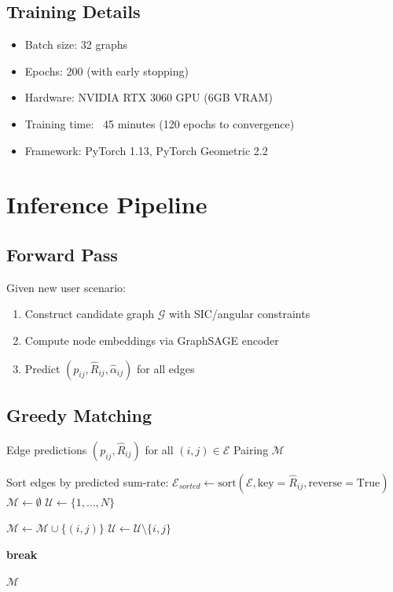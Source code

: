 \subsection{Training Details}

\begin{itemize}
    \item Batch size: 32 graphs
    \item Epochs: 200 (with early stopping)
    \item Hardware: NVIDIA RTX 3060 GPU (6GB VRAM)
    \item Training time: ~45 minutes (120 epochs to convergence)
    \item Framework: PyTorch 1.13, PyTorch Geometric 2.2
\end{itemize}

\section{Inference Pipeline}

\subsection{Forward Pass}

Given new user scenario:
\begin{enumerate}
    \item Construct candidate graph $\mathcal{G}$ with SIC/angular constraints
    \item Compute node embeddings via GraphSAGE encoder
    \item Predict $(p_{ij}, \hat{R}_{ij}, \hat{\alpha}_{ij})$ for all edges
\end{enumerate}

\subsection{Greedy Matching}

\begin{algorithm}[H]
\caption{Greedy Matching via Predicted Rates}
\label{alg:greedy_gnn}
\begin{algorithmic}[1]
\Require Edge predictions $(p_{ij}, \hat{R}_{ij})$ for all $(i,j) \in \mathcal{E}$
\Ensure Pairing $\mathcal{M}$

\State Sort edges by predicted sum-rate: $\mathcal{E}_{sorted} \gets \text{sort}(\mathcal{E}, \text{key}=\hat{R}_{ij}, \text{reverse}=\text{True})$
\State $\mathcal{M} \gets \emptyset$ 
\State $\mathcal{U} \gets \{1, \ldots, N\}$ 

        \State $\mathcal{M} \gets \mathcal{M} \cup \{(i,j)\}$
        \State $\mathcal{U} \gets \mathcal{U} \setminus \{i, j\}$
    \EndIf
    
        \State \textbf{break} 
    \EndIf
\EndFor

\State \Return $\mathcal{M}$
\end{algorithmic}
\end{algorithm}

